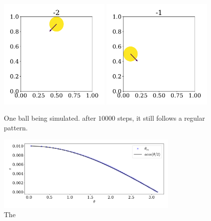 \documentclass{article}
\begin{document}
        \begin{figure}
            \centering
            \includegraphics[width=0.49\textwidth]{../plots/test_case_one_particle/particle-2.pdf}
            \includegraphics[width=0.49\textwidth]{../plots/test_case_one_particle/particle-1.pdf}
            \caption{One ball being simulated. after $10 000$ steps, it still follows a regular pattern.}
            \label{single particle}
        \end{figure}

        \begin{figure}
            \centering
            \includegraphics[width=0.8\textwidth]{../plots/test_case_collision_angle/collision_angle.pdf}
            \caption{The }
            \label{scattering}
        \end{figure}
\end{document}
